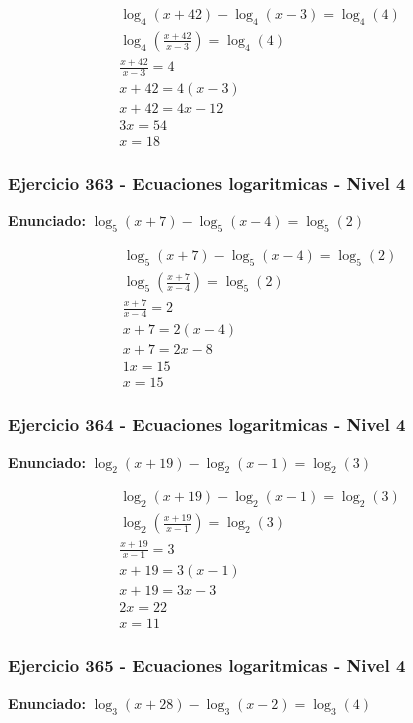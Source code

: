 \documentclass[12pt,a4paper]{article}
\begin{document}
\[
\begin{aligned}
\log_{4}\left(x+42\right) - \log_{4}\left(x-3\right)=\log_{4}\left(4\right)\\
\log_{4}\left(\frac{x+42}{x-3}\right)=\log_{4}\left(4\right)\\
\frac{x+42}{x-3}=4\\
x+42=4(x-3)\\
x+42=4x-12\\
3x=54\\
\boxed{x=18}
\end{aligned}
\]


\subsubsection*{Ejercicio 363 - Ecuaciones logaritmicas - Nivel 4}
\textbf{Enunciado:} \(\log_{5}\left(x+7\right) - \log_{5}\left(x-4\right)=\log_{5}\left(2\right)\)

\[
\begin{aligned}
\log_{5}\left(x+7\right) - \log_{5}\left(x-4\right)=\log_{5}\left(2\right)\\
\log_{5}\left(\frac{x+7}{x-4}\right)=\log_{5}\left(2\right)\\
\frac{x+7}{x-4}=2\\
x+7=2(x-4)\\
x+7=2x-8\\
1x=15\\
\boxed{x=15}
\end{aligned}
\]


\subsubsection*{Ejercicio 364 - Ecuaciones logaritmicas - Nivel 4}
\textbf{Enunciado:} \(\log_{2}\left(x+19\right) - \log_{2}\left(x-1\right)=\log_{2}\left(3\right)\)

\[
\begin{aligned}
\log_{2}\left(x+19\right) - \log_{2}\left(x-1\right)=\log_{2}\left(3\right)\\
\log_{2}\left(\frac{x+19}{x-1}\right)=\log_{2}\left(3\right)\\
\frac{x+19}{x-1}=3\\
x+19=3(x-1)\\
x+19=3x-3\\
2x=22\\
\boxed{x=11}
\end{aligned}
\]


\subsubsection*{Ejercicio 365 - Ecuaciones logaritmicas - Nivel 4}
\textbf{Enunciado:} \(\log_{3}\left(x+28\right) - \log_{3}\left(x-2\right)=\log_{3}\left(4\right)\)
\end{document}
